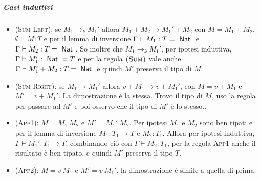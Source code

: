 \subparagraph{Casi induttivi} 

\begin{itemize}
	\item \textsc{(Sum-Left)}: se $M_1 \rightarrow_k M_1'$ allora $M_1 + M_2 \rightarrow M_1' + M_2$ con $M = M_1 + M_2$, $\emptyset \vdash M :T $ e per il lemma di inversione $\Gamma \vdash M_1 : T = \Nat$ e $\Gamma \vdash M_2 : T = \Nat$. So inoltre che $M_1 \rightarrow_k M_1'$, per ipotesi induttiva, $\Gamma \vdash M_1' : \Nat = T$ e per la regola $\textsc{(Sum)}$ vale anche $\Gamma \vdash M_1' + M_2 : T = \Nat$ e quindi $M'$ preserva il tipo di $M$.
	\item \textsc{(Sum-Right)}: se $M_1 \rightarrow M_1'$ allora $v + M_1 \rightarrow v + M_1'$, con $M = v + M_1$ e $M' = v + M_1'$. La dimostrazione è la stessa. Trovo il tipo di $M$, uso la regola per passare ad $M'$ e poi osservo che il tipo di $M'$ è lo stesso..
	\item \textsc{(App1)}: $M = M_1 \: M_2$ e $M' = M_1' \: M_2$. Per ipotesi $M_1$ e $M_2$ sono ben tipati e per il lemma di inversione $M_1 : T_1 \rightarrow T$ e $M_2 : T_1$. Allora per ipotesi induttiva, $\Gamma \vdash M_1' : T_1 \rightarrow T$, combinando ciò con $\Gamma \vdash M_2 : T_1$, per la regola \textsc{App1} anche il risultato è ben tipato, e quindi $M'$ preserva il tipo $T$.
	\item \textsc{(App2)}: $M = v \: M_1$ e $M' = v \: M_1'$. la dimostrazione è simile a quella di prima.
\end{itemize}





